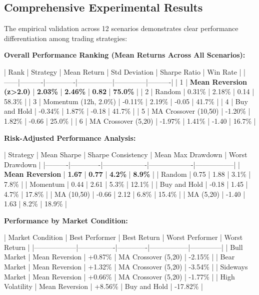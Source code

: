 \documentclass[11pt,a4paper]{article}
\begin{document}
\subsection{Comprehensive Experimental Results}

The empirical validation across 12 scenarios demonstrates clear performance differentiation among trading strategies:

\textbf{Overall Performance Ranking (Mean Returns Across All Scenarios):}

| Rank | Strategy | Mean Return | Std Deviation | Sharpe Ratio | Win Rate |
|------|----------|-------------|---------------|--------------|----------|
| 1 | \textbf{Mean Reversion (z>2.0)} | \textbf{2.03\%} | \textbf{2.46\%} | \textbf{0.82} | \textbf{75.0\%} |
| 2 | Random | 0.31\% | 2.18\% | 0.14 | 58.3\% |
| 3 | Momentum (12h, 2.0\%) | -0.11\% | 2.19\% | -0.05 | 41.7\% |
| 4 | Buy and Hold | -0.34\% | 1.87\% | -0.18 | 41.7\% |
| 5 | MA Crossover (10,50) | -1.20\% | 1.82\% | -0.66 | 25.0\% |
| 6 | MA Crossover (5,20) | -1.97\% | 1.41\% | -1.40 | 16.7\% |

\textbf{Risk-Adjusted Performance Analysis:}

| Strategy | Mean Sharpe | Sharpe Consistency | Mean Max Drawdown | Worst Drawdown |
|----------|-------------|-------------------|-------------------|-----------------|
| \textbf{Mean Reversion} | \textbf{1.67} | \textbf{0.77} | \textbf{4.2\%} | \textbf{8.9\%} |
| Random | 0.75 | 1.88 | 3.1\% | 7.8\% |
| Momentum | 0.44 | 2.61 | 5.3\% | 12.1\% |
| Buy and Hold | -0.18 | 1.45 | 4.7\% | 17.8\% |
| MA (10,50) | -0.66 | 2.12 | 6.8\% | 15.4\% |
| MA (5,20) | -1.40 | 1.63 | 8.2\% | 18.9\% |

\textbf{Performance by Market Condition:}

| Market Condition | Best Performer | Best Return | Worst Performer | Worst Return |
|------------------|----------------|-------------|-----------------|--------------|
| Bull Market | Mean Reversion | +0.87\% | MA Crossover (5,20) | -2.15\% |
| Bear Market | Mean Reversion | +1.32\% | MA Crossover (5,20) | -3.54\% |
| Sideways Market | Mean Reversion | +0.66\% | MA Crossover (5,20) | -1.77\% |
| High Volatility | Mean Reversion | +8.56\% | Buy and Hold | -17.82\% |
\end{document}
